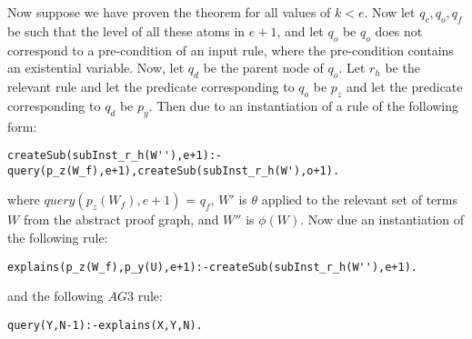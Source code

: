 \documentclass[sigconf]{acmart}
\begin{document}
Now suppose we have proven the theorem for all values of $k<e$. Now let $q_{c},q_{o},q_{f}$ be such that the level of all these atoms in $e+1$, and let $q_{o}$ be $q_{o}$ does not correspond to a pre-condition of an input rule, where the pre-condition contains an existential variable. Now, let $q_{d}$ be the parent node of $q_{o}$. Let $r_{h}$ be the relevant rule and let the predicate corresponding to $q_{o}$ be $p_{z}$ and let the predicate corresponding to $q_{d}$ be $p_{y}$. Then due to an instantiation of a rule of the following form:
\begin{verbatim}
createSub(subInst_r_h(W''),e+1):-query(p_z(W_f),e+1),createSub(subInst_r_h(W'),o+1).
\end{verbatim}
where $query(p_{z}(W_{f}),e+1)$ = $q_{f}$, $W'$ is $\theta$ applied to the relevant set of terms $W$ from the abstract proof graph, and $W''$ is $\phi(W)$. Now due an instantiation of the following rule:
\begin{verbatim}
explains(p_z(W_f),p_y(U),e+1):-createSub(subInst_r_h(W''),e+1).
\end{verbatim} and the following $AG3$ rule:
\begin{verbatim}
query(Y,N-1):-explains(X,Y,N).    
\end{verbatim}
\end{document}
